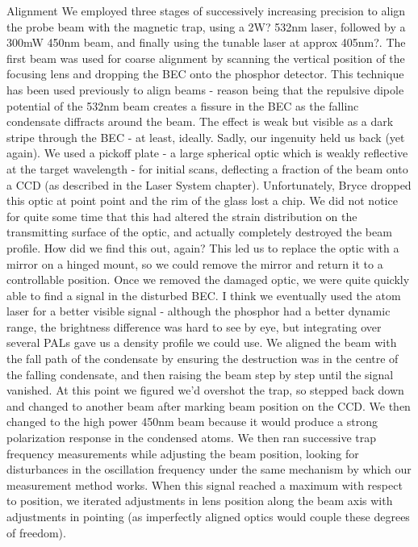 Alignment We employed three stages of successively increasing precision
to align the probe beam with the magnetic trap, using a 2W? 532nm laser,
followed by a 300mW 450nm beam, and finally using the tunable laser at
approx 405nm?.
	The first beam was used for coarse alignment by scanning
the vertical position of the focusing lens and dropping the BEC onto the
phosphor detector.
	This technique has been used previously to align
beams - reason being that the repulsive dipole potential of the 532nm
beam creates a fissure in the BEC as the fallinc condensate diffracts
around the beam.
	The effect is weak but visible as a dark stripe through
the BEC - at least, ideally.
	Sadly, our ingenuity held us back (yet
again).
	We used a pickoff plate - a large spherical optic which is
weakly reflective at the target wavelength - for initial scans,
deflecting a fraction of the beam onto a CCD (as described in the Laser
System chapter).
	Unfortunately, Bryce dropped this optic at point point
and the rim of the glass lost a chip.
	We did not notice for quite some
time that this had altered the strain distribution on the transmitting
surface of the optic, and actually completely destroyed the beam
profile.
	How did we find this out, again? This led us to replace the
optic with a mirror on a hinged mount, so we could remove the mirror and
return it to a controllable position.
	Once we removed the damaged optic,
we were quite quickly able to find a signal in the disturbed BEC.
	I
think we eventually used the atom laser for a better visible signal -
although the phosphor had a better dynamic range, the brightness
difference was hard to see by eye, but integrating over several PALs
gave us a density profile we could use.
	We aligned the beam with the
fall path of the condensate by ensuring the destruction was in the
centre of the falling condensate, and then raising the beam step by step
until the signal vanished.
	At this point we figured we'd overshot the
trap, so stepped back down and changed to another beam after marking
beam position on the CCD.
	We then changed to the high power 450nm beam
because it would produce a strong polarization response in the condensed
atoms.
	We then ran successive trap frequency measurements while
adjusting the beam position, looking for disturbances in the oscillation
frequency under the same mechanism by which our measurement method
works.
	When this signal reached a maximum with respect to position, we
iterated adjustments in lens position along the beam axis with
adjustments in pointing (as imperfectly aligned optics would couple
these degrees of freedom).
